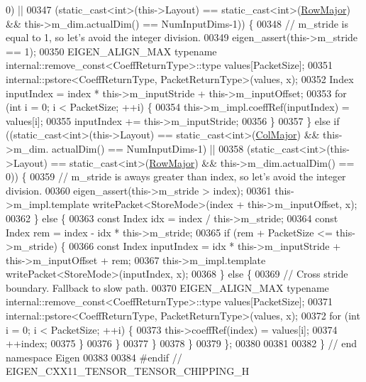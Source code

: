 \begin{DoxyCode}
       0) ||
00347     (static\_cast<int>(this->Layout) == \textcolor{keyword}{static\_cast<}\textcolor{keywordtype}{int}\textcolor{keyword}{>}(\hyperlink{group__enums_ggaacded1a18ae58b0f554751f6cdf9eb13acfcde9cd8677c5f7caf6bd603666aae3}{RowMajor}) && this->m\_dim.actualDim() == 
      NumInputDims-1)) \{
00348       \textcolor{comment}{// m\_stride is equal to 1, so let's avoid the integer division.}
00349       eigen\_assert(this->m\_stride == 1);
00350       EIGEN\_ALIGN\_MAX \textcolor{keyword}{typename} internal::remove\_const<CoeffReturnType>::type values[PacketSize];
00351       internal::pstore<CoeffReturnType, PacketReturnType>(values, x);
00352       Index inputIndex = index * this->m\_inputStride + this->m\_inputOffset;
00353       \textcolor{keywordflow}{for} (\textcolor{keywordtype}{int} i = 0; i < PacketSize; ++i) \{
00354         this->m\_impl.coeffRef(inputIndex) = values[i];
00355         inputIndex += this->m\_inputStride;
00356       \}
00357     \} \textcolor{keywordflow}{else} \textcolor{keywordflow}{if} ((static\_cast<int>(this->Layout) == static\_cast<int>(\hyperlink{group__enums_ggaacded1a18ae58b0f554751f6cdf9eb13a0cbd4bdd0abcfc0224c5fcb5e4f6669a}{ColMajor}) && this->m\_dim.
      actualDim() == NumInputDims-1) ||
00358            (static\_cast<int>(this->Layout) == \textcolor{keyword}{static\_cast<}\textcolor{keywordtype}{int}\textcolor{keyword}{>}(\hyperlink{group__enums_ggaacded1a18ae58b0f554751f6cdf9eb13acfcde9cd8677c5f7caf6bd603666aae3}{RowMajor}) && this->m\_dim.actualDim()
       == 0)) \{
00359       \textcolor{comment}{// m\_stride is aways greater than index, so let's avoid the integer division.}
00360       eigen\_assert(this->m\_stride > index);
00361       this->m\_impl.template writePacket<StoreMode>(index + this->m\_inputOffset, x);
00362     \} \textcolor{keywordflow}{else} \{
00363       \textcolor{keyword}{const} Index idx = index / this->m\_stride;
00364       \textcolor{keyword}{const} Index rem = index - idx * this->m\_stride;
00365       \textcolor{keywordflow}{if} (rem + PacketSize <= this->m\_stride) \{
00366         \textcolor{keyword}{const} Index inputIndex = idx * this->m\_inputStride + this->m\_inputOffset + rem;
00367         this->m\_impl.template writePacket<StoreMode>(inputIndex, x);
00368       \} \textcolor{keywordflow}{else} \{
00369         \textcolor{comment}{// Cross stride boundary. Fallback to slow path.}
00370         EIGEN\_ALIGN\_MAX \textcolor{keyword}{typename} internal::remove\_const<CoeffReturnType>::type values[PacketSize];
00371         internal::pstore<CoeffReturnType, PacketReturnType>(values, x);
00372         \textcolor{keywordflow}{for} (\textcolor{keywordtype}{int} i = 0; i < PacketSize; ++i) \{
00373           this->coeffRef(index) = values[i];
00374           ++index;
00375         \}
00376       \}
00377     \}
00378   \}
00379 \};
00380 
00381 
00382 \} \textcolor{comment}{// end namespace Eigen}
00383 
00384 \textcolor{preprocessor}{#endif // EIGEN\_CXX11\_TENSOR\_TENSOR\_CHIPPING\_H}
\end{DoxyCode}
